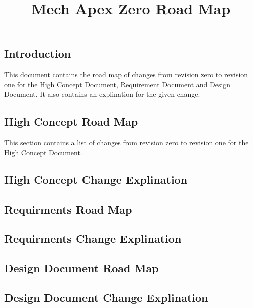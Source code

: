 \documentclass[]{article}
\title{Mech Apex Zero Road Map}
\author{}
\begin{document}
\maketitle
\subsection*{Introduction}
This document contains the road map of changes from revision zero to revision one for the High Concept Document, Requirement Document and Design Document. It also  contains an explination for the given change.
\subsection*{High Concept Road Map}
This section contains a list of changes from revision zero to revision one for the High Concept Document.

\subsection*{High Concept Change Explination}

\subsection*{Requirments Road Map}

\subsection*{Requirments Change Explination}

\subsection*{Design Document Road Map}

\subsection*{Design Document Change Explination}
\end{document}
